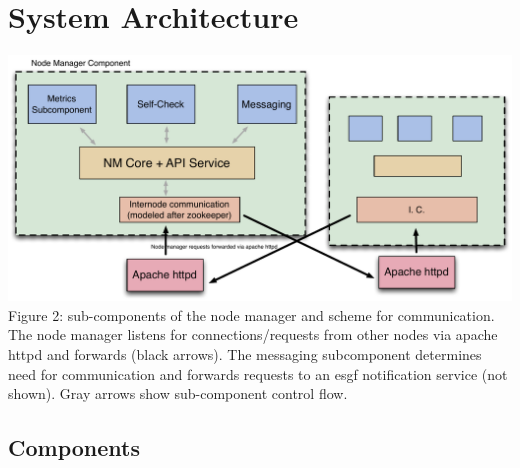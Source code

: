 \documentclass[oneside,12pt]{memoir}
\begin{document}
\section{System Architecture}



\begin{center}
\includegraphics[width=\textwidth]{presentation/NM-design-v2.pdf}
Figure 2:  sub-components of the node manager and scheme for communication.  The node manager listens for connections/requests from other nodes via apache httpd and forwards (black arrows).  The messaging subcomponent determines need for communication and forwards requests to an esgf notification service (not shown).  Gray arrows show sub-component control flow.
\end{center}
\newpage

\subsection{Components}
\label{stow}
\end{document}
